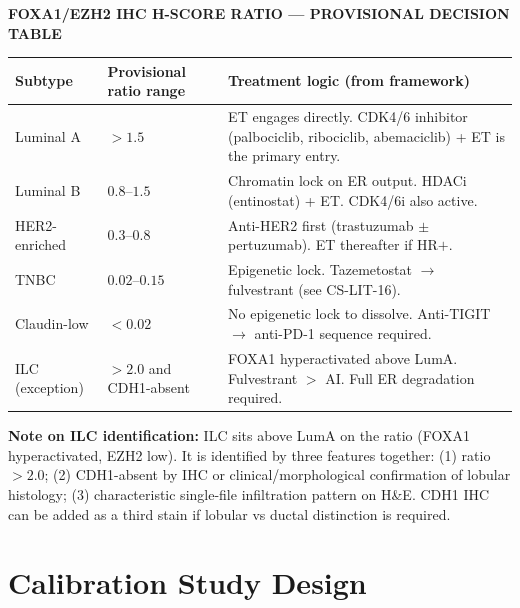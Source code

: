 \documentclass[11pt, a4paper]{article}
\begin{document}
\begin{center}
\colorbox{decisionbox}{
\begin{minipage}{0.92\textwidth}
\vspace{0.8em}
\textbf{FOXA1/EZH2 IHC H-SCORE RATIO ---
PROVISIONAL DECISION TABLE}\\[0.6em]
\begin{tabular}{p{3cm}p{2.5cm}p{6.5cm}}
\toprule
\textbf{Subtype} &
\textbf{Provisional ratio range} &
\textbf{Treatment logic
(from framework)} \\
\midrule
Luminal A &
$> 1.5$ &
ET engages directly.
CDK4/6 inhibitor (palbociclib,
ribociclib, abemaciclib) + ET
is the primary entry. \\[0.4em]
Luminal B &
$0.8$--$1.5$ &
Chromatin lock on ER output.
HDACi (entinostat) + ET.
CDK4/6i also active. \\[0.4em]
HER2-enriched &
$0.3$--$0.8$ &
Anti-HER2 first (trastuzumab
$\pm$ pertuzumab).
ET thereafter if HR$+$. \\[0.4em]
TNBC &
$0.02$--$0.15$ &
Epigenetic lock.
Tazemetostat $\rightarrow$
fulvestrant (see CS-LIT-16). \\[0.4em]
Claudin-low &
$< 0.02$ &
No epigenetic lock to dissolve.
Anti-TIGIT $\rightarrow$
anti-PD-1 sequence required. \\[0.4em]
ILC
(exception) &
$> 2.0$ and
CDH1-absent &
FOXA1 hyperactivated above LumA.
Fulvestrant $>$ AI.
Full ER degradation required. \\
\bottomrule
\end{tabular}
\vspace{0.5em}
\end{minipage}}
\end{center}

\vspace{0.5em}

\textbf{Note on ILC identification:} ILC sits
above LumA on the ratio (FOXA1 hyperactivated,
EZH2 low). It is identified by three features
together: (1) ratio $>2.0$; (2) CDH1-absent
by IHC or clinical/morphological confirmation
of lobular histology; (3) characteristic
single-file infiltration pattern on H\&E.
CDH1 IHC can be added as a third stain
if lobular vs ductal distinction is required.

\section{Calibration Study Design}
\label{sec:calibration}
\end{document}
